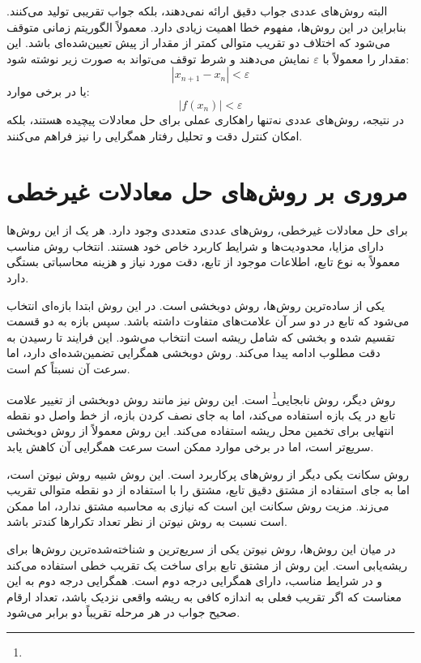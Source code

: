 البته روش‌های عددی جواب دقیق ارائه نمی‌دهند، بلکه جواب تقریبی تولید می‌کنند. بنابراین در این روش‌ها، مفهوم خطا اهمیت زیادی دارد. معمولاً الگوریتم زمانی متوقف می‌شود که اختلاف دو تقریب متوالی کمتر از مقدار از پیش تعیین‌شده‌ای باشد. این مقدار را معمولاً با $\varepsilon$ نمایش می‌دهند و شرط توقف می‌تواند به صورت زیر نوشته شود:
\begin{equation}
|x_{n+1}-x_n|<\varepsilon
\label{eq:stopdiff}
\end{equation}
یا در برخی موارد:
\begin{equation}
|f(x_n)|<\varepsilon
\label{eq:stopfunc}
\end{equation}
در نتیجه، روش‌های عددی نه‌تنها راهکاری عملی برای حل معادلات پیچیده هستند، بلکه امکان کنترل دقت و تحلیل رفتار همگرایی را نیز فراهم می‌کنند.

\section{مروری بر روش‌های حل معادلات غیرخطی}

برای حل معادلات غیرخطی، روش‌های عددی متعددی وجود دارد. هر یک از این روش‌ها دارای مزایا، محدودیت‌ها و شرایط کاربرد خاص خود هستند. انتخاب روش مناسب معمولاً به نوع تابع، اطلاعات موجود از تابع، دقت مورد نیاز و هزینه محاسباتی بستگی دارد.

یکی از ساده‌ترین روش‌ها، روش دوبخشی است. در این روش ابتدا بازه‌ای انتخاب می‌شود که تابع در دو سر آن علامت‌های متفاوت داشته باشد. سپس بازه به دو قسمت تقسیم شده و بخشی که شامل ریشه است انتخاب می‌شود. این فرایند تا رسیدن به دقت مطلوب ادامه پیدا می‌کند. روش دوبخشی همگرایی تضمین‌شده‌ای دارد، اما سرعت آن نسبتاً کم است.

روش دیگر، روش نابجایی\footnote{} است. این روش نیز مانند روش دوبخشی از تغییر علامت تابع در یک بازه استفاده می‌کند، اما به جای نصف کردن بازه، از خط واصل دو نقطه انتهایی برای تخمین محل ریشه استفاده می‌کند. این روش معمولاً از روش دوبخشی سریع‌تر است، اما در برخی موارد ممکن است سرعت همگرایی آن کاهش یابد.

روش سکانت یکی دیگر از روش‌های پرکاربرد است. این روش شبیه روش نیوتن است، اما به جای استفاده از مشتق دقیق تابع، مشتق را با استفاده از دو نقطه متوالی تقریب می‌زند. مزیت روش سکانت این است که نیازی به محاسبه مشتق ندارد، اما ممکن است نسبت به روش نیوتن از نظر تعداد تکرارها کندتر باشد.

در میان این روش‌ها، روش نیوتن یکی از سریع‌ترین و شناخته‌شده‌ترین روش‌ها برای ریشه‌یابی است. این روش از مشتق تابع برای ساخت یک تقریب خطی استفاده می‌کند و در شرایط مناسب، دارای همگرایی درجه دوم است. همگرایی درجه دوم به این معناست که اگر تقریب فعلی به اندازه کافی به ریشه واقعی نزدیک باشد، تعداد ارقام صحیح جواب در هر مرحله تقریباً دو برابر می‌شود.

